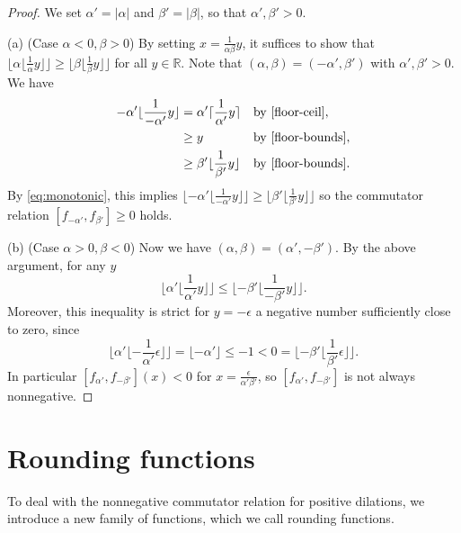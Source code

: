 \documentclass[11pt, letterpaper, reqno]{amsart}
\theoremstyle{definition}
\numberwithin{equation}{section}
\newcommand{\RR}{\ensuremath{\mathbb{R}}}
\newcommand{\floor}[1]{\lfloor{#1}\rfloor}
\newcommand{\ceil}[1]{\lceil{#1}\rceil}
\newcommand{\alphap}{{\alpha'}}
\newcommand{\betap}{{\beta'}}
\begin{document}
\begin{proof}
We set $\alphap = |\alpha|$ and $\betap = |\beta|$, so  that $\alphap, \betap > 0$.

(a) (Case $\alpha<0, \beta >0$) 
By setting $x = \frac1{\alpha\beta}y$, it suffices to show that $\floor{ \alpha \floor{ \frac{1}{\alpha} y}} \geq \floor{\beta \floor{\frac{1}{\beta} y}}$
for all $y\in \RR$.
Note that  $(\alpha, \beta) = (-\alphap, \betap)$ with $\alphap, \betap > 0$.
We have
\begin{align*}
\qquad %
{-\alphap \floor{\frac{1}{-\alphap} y}} 
&= {\alphap \ceil{\frac{1}{\alphap} y}}
    && \text{by }\eqref{floor-ceil},\\
&\geq y 
    && \text{by }\eqref{floor-bounds},\\
&\geq {\betap \floor{\frac{1}{\betap} y}} %
    && \text{by }\eqref{floor-bounds}. \qquad
\end{align*}
By \eqref{eq:monotonic}, this implies
$\floor{-\alphap \floor{\frac{1}{-\alphap} y}} \geq \floor{ \betap \floor{\frac1{\betap} y}}$
so the commutator relation $[f_{-\alphap}, f_{\betap}] \ge 0$ holds.


(b) (Case $\alpha>0, \beta <0$) 
Now we have $(\alpha, \beta) = (\alphap, -\betap)$.
By the above argument, for any $y$
$$
{ \floor{\alphap \floor{\frac{1}{\alphap}y}} \leq \floor{ -\betap \floor{\frac{1}{-\betap} y}} }.
$$
Moreover, this inequality is strict for $y = -\epsilon$ a negative number sufficiently close to zero, since
\begin{equation*}
\floor{ \alphap \floor{-\frac{1}{\alphap} \epsilon}}  = \floor{-\alphap} \leq -1 < 0 = \floor{ -\betap \floor{ \frac{1}{\betap} \epsilon}}.
\end{equation*}
In particular $[f_{\alphap}, f_{-\betap}](x) <0$ for $x = \frac{\epsilon}{\alphap\betap}$, so 
$[f_\alphap, f_{-\betap}]$ is not always nonnegative.
\end{proof}


%
%
\section{Rounding functions}
\label{sec:rounding}
\setcounter{equation}{0}


To deal with the nonnegative commutator relation for  positive dilations, we 
introduce a new family of functions, which we call rounding functions. 
\end{document}
